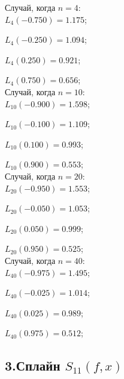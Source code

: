 \documentclass[rus, 12 pt]{article}
\begin{document}
    Случай, когда $n=4$:\\

    
    

    
    $L_{4}(-0.750)=1.175$;

    
    $L_{4}(-0.250)=1.094$;

    
    $L_{4}(0.250)=0.921$;

    
    $L_{4}(0.750)=0.656$;\\

    
    

    
    Случай, когда $n=10$:\\

    
    

    
    $L_{10}(-0.900)=1.598$;

    
    $L_{10}(-0.100)=1.109$;

    
    $L_{10}(0.100)=0.993$;

    
    $L_{10}(0.900)=0.553$;\\

    
    

    
    Случай, когда $n=20$:\\

    
    

    
    $L_{20}(-0.950)=1.553$;

    
    $L_{20}(-0.050)=1.053$;

    
    $L_{20}(0.050)=0.999$;

    
    $L_{20}(0.950)=0.525$;\\

    
    

    
    Случай, когда $n=40$:\\

    
    

    
    $L_{40}(-0.975)=1.495$;

    
    $L_{40}(-0.025)=1.014$;

    
    $L_{40}(0.025)=0.989$;

    
    $L_{40}(0.975)=0.512$;\\

    
    

    
    \hypertarget{ux441ux43fux43bux430ux439ux43d-s_11fx}{%
\subsection{\texorpdfstring{3.Сплайн
\(S_{11}(f,x)\)}{3.Сплайн S\_\{11\}(f,x)}}\label{ux441ux43fux43bux430ux439ux43d-s_11fx}}
\end{document}
